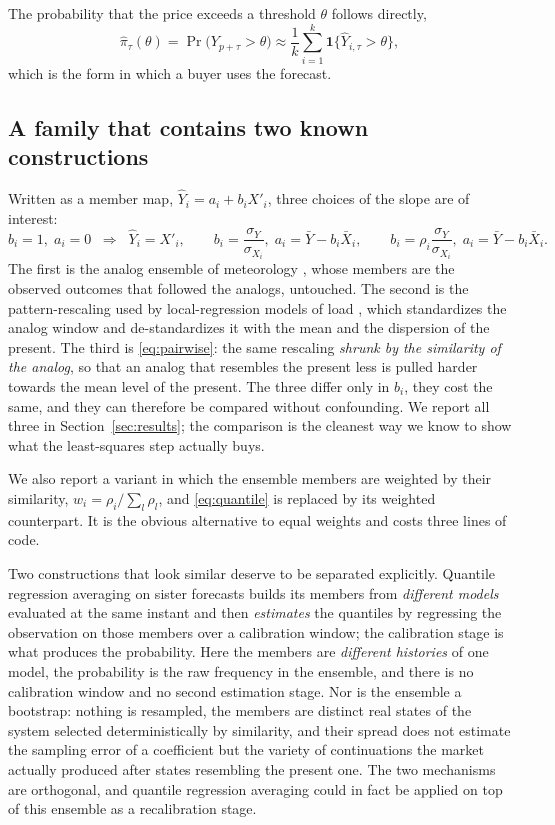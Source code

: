 \documentclass[12pt,a4paper]{article}
\begin{document}
The probability that the price exceeds a threshold $\theta$ follows directly,
\begin{equation}
\hat\pi_\tau(\theta)=\Pr\bigl(Y_{p+\tau}>\theta\bigr)\approx
\frac{1}{k}\sum_{i=1}^{k}\mathbf{1}\bigl\{\hat Y_{i,\tau}>\theta\bigr\},
\end{equation}
which is the form in which a buyer uses the forecast.

\subsection{A family that contains two known constructions}
\label{sec:family}

Written as a member map, $\hat Y_i=a_i+b_i X'_i$, three choices of the slope
are of interest:
\begin{equation}
b_i=1,\; a_i=0
\;\;\Longrightarrow\;\; \hat Y_i=X'_i ,
\qquad
b_i=\frac{\sigma_Y}{\sigma_{X_i}},\; a_i=\bar Y-b_i\bar X_i ,
\qquad
b_i=\rho_i\frac{\sigma_Y}{\sigma_{X_i}},\; a_i=\bar Y-b_i\bar X_i .
\label{eq:family}
\end{equation}
The first is the analog ensemble of meteorology
\citep{DelleMonache2013,Alessandrini2015}, whose members are the observed
outcomes that followed the analogs, untouched. The second is the
pattern-rescaling used by local-regression models of load
\citep{Dudek2016}, which standardizes the analog window and de-standardizes it
with the mean and the dispersion of the present. The third is
\eqref{eq:pairwise}: the same rescaling \emph{shrunk by the similarity of the
analog}, so that an analog that resembles the present less is pulled harder
towards the mean level of the present. The three differ only in $b_i$, they
cost the same, and they can therefore be compared without confounding. We
report all three in Section~\ref{sec:results}; the comparison is the cleanest
way we know to show what the least-squares step actually buys.

We also report a variant in which the ensemble members are weighted by their
similarity, $w_i=\rho_i/\sum_l \rho_l$, and \eqref{eq:quantile} is replaced by
its weighted counterpart. It is the obvious alternative to equal weights and
costs three lines of code.

Two constructions that look similar deserve to be separated explicitly.
Quantile regression averaging on sister forecasts \citep{Liu2017} builds its
members from \emph{different models} evaluated at the same instant and then
\emph{estimates} the quantiles by regressing the observation on those members
over a calibration window; the calibration stage is what produces the
probability. Here the members are \emph{different histories} of one model,
the probability is the raw frequency in the ensemble, and there is no
calibration window and no second estimation stage. Nor is the ensemble a
bootstrap: nothing is resampled, the members are distinct real states of the
system selected deterministically by similarity, and their spread does not
estimate the sampling error of a coefficient but the variety of continuations
the market actually produced after states resembling the present one. The two
mechanisms are orthogonal, and quantile regression averaging could in fact be
applied on top of this ensemble as a recalibration stage.
\end{document}
